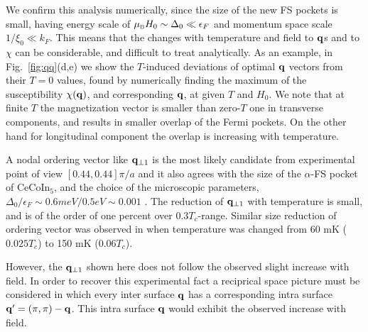 \documentclass[aps,prl,twocolumn,showpacs,amsmath,amssymb]{revtex4-1}
\newcommand{\cecoin}{CeCoIn$_5$}
\begin{document}
We confirm this analysis numerically, 
since the size of the new FS pockets is small, having energy scale of 
$\mu_{\mbox{\tiny B}}H_0 \sim \Delta_0 \ll \epsilon_F$ 
and momentum space scale $1/\xi_0 \ll k_F$. This means that the changes with temperature 
and field to ${\bf q}$s and to $\chi$ can be considerable, and difficult to treat 
analytically. 
As an example, in Fig.~\ref{fig:qq}(d,e) 
we show the $T$-induced deviations of optimal ${\bf q}$ vectors from their $T=0$ values, 
found by numerically finding the maximum of the susceptibility $\chi({\bf q})$, 
and corresponding ${\bf q}$, at given $T$ and $H_0$. 
We note that at finite $T$ the magnetization vector is smaller than zero-$T$ one in 
transverse components, and results in smaller overlap of the Fermi pockets.
On the other hand for longitudinal component the overlap is increasing with temperature. 

A nodal ordering vector  like ${\bf q}_{\perp 1}$ is the most likely candidate 
from experimental point of view $[0.44,0.44]\pi/a$ \cite{Kenzelmann10_Qphase} and it also agrees with 
the size of the $\alpha$-FS pocket of \cecoin, \cite{suzuki11_sdw_vortex}
and the choice of the microscopic parameters, 
$\Delta_0/\epsilon_F \sim 0.6 meV/0.5 eV \sim 0.001$ \cite{Allan2013_stm115,Maehira03_fs115}. 
The reduction of  ${\bf q}_{\perp 1}$ with temperature is small, 
and is of the order of one percent over $0.3 T_c$-range. Similar size reduction of 
ordering vector was observed in \cite{Kenzelmann10_Qphase} when temperature 
was changed from 60 mK ($0.025 T_c$) to 150 mK ($0.06 T_c$). 


However, the ${\bf q}_{\perp 1}$ shown here does not follow the observed \cite{Kenzelmann10_Qphase} slight increase with field. In order to recover this experimental fact a reciprical space picture must be considered in which every inter surface ${\bf q}$ has a corresponding intra surface $ {\bf q}' = (\pi,\pi) - {\bf q} $. This intra surface ${\bf q}$ would exhibit the observed increase with field.
\end{document}

